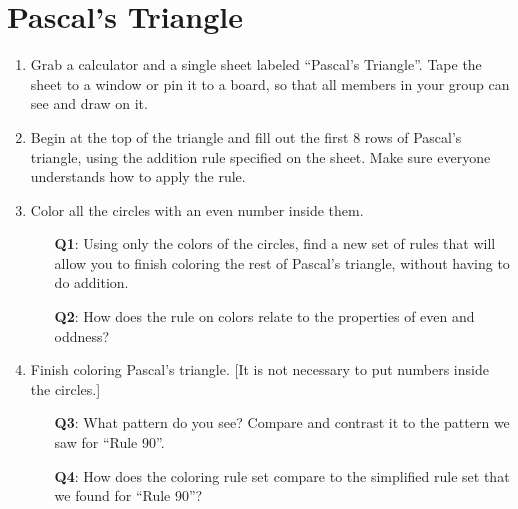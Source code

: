 \documentclass{article}
\begin{document}
\section*{Pascal's Triangle}

\begin{enumerate}
	\item Grab a calculator and a single sheet labeled ``Pascal's Triangle''.
	Tape the sheet to a window or pin it to a board, so that all members in your
	group can see and draw on it.

	\item Begin at the top of the triangle and fill out the first 8 rows of
	Pascal's triangle, using the addition rule specified on the sheet. Make sure
	everyone understands how to apply the rule.

	\item Color all the circles with an even number inside them.

	\begin{itemize}
		\item[\textbf{Q1}:] Using only the colors of the circles, find a
		new set of rules that will allow you to finish coloring the rest of
		Pascal's triangle, without having to do addition.

		\item [\textbf{Q2}:] How does the rule on colors relate to the properties
		of even and oddness?

	\end{itemize}

	\item Finish coloring Pascal's triangle. [It is not necessary to put numbers
	inside the circles.]

	\begin{itemize}

		\item[\textbf{Q3}:] What pattern do you see? Compare and contrast it
		to the pattern we saw for ``Rule 90''.


		\item[\textbf{Q4}:] How does the coloring rule set compare to the simplified
		rule set that we found for ``Rule 90''?

	\end{itemize}


\end{enumerate}

\newpage
\end{document}
